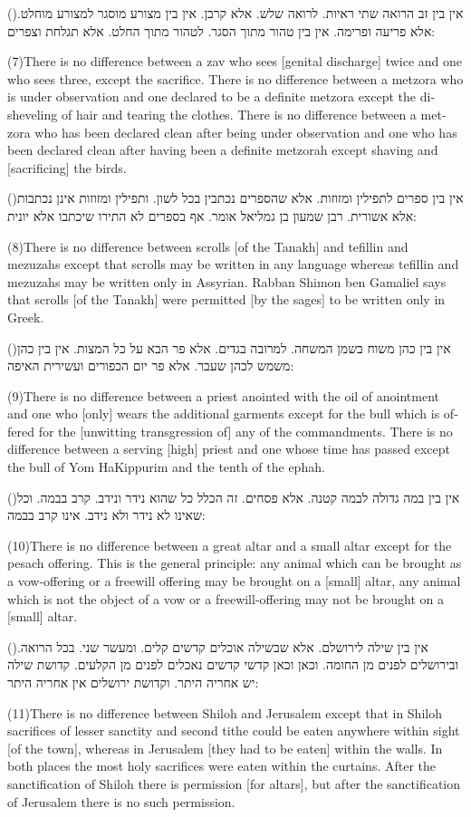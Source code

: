 \documentclass[12pt, openany]{book}
\newcommand{\sethebfont}{
\fontsize{10.5pt}{13.1pt} \selectfont
}
\newcommand{\hebeng}[2]{
	{\sethebfont #1\\}
	
	\begin{english}
		#2
	\end{english}
}
\newcommand{\vsnum}[1]{(\hebrewnumeral{#1})\space}
\newcommand{\vsnumeng}[1]{(#1)\space}
\begin{document}
\hebeng{\vsnum{7}אין בין זב הרואה שתי ראיות. לרואה שלש. אלא קרבן. אין בין מצורע מוסגר למצורע מוחלט. אלא פריעה ופרימה. אין בין טהור מתוך הסגר. לטהור מתוך החלט. אלא תגלחת וצפרים: 
}{\vsnumeng{7}There is no difference between a zav who sees {[genital discharge]} twice and one who sees three, except the sacrifice. There is no difference between a metzora who is under observation and one declared to be a definite metzora except the disheveling of hair and tearing the clothes. There is no difference between a metzora who has been declared clean after being under observation and one who has been declared clean after having been a definite metzorah except shaving and {[sacrificing]} the birds.}%

\hebeng{\vsnum{8}אין בין ספרים לתפילין ומזוזות. אלא שהספרים נכתבין בכל לשון. ותפילין ומזוזות אינן נכתבות אלא אשורית. רבן שמעון בן גמליאל אומר. אף בספרים לא התירו שיכתבו אלא יונית: 
}{\vsnumeng{8}There is no difference between scrolls {[of the Tanakh]} and tefillin and mezuzahs except that scrolls may be written in any language whereas tefillin and mezuzahs may be written only in Assyrian. Rabban Shimon ben Gamaliel says that scrolls {[of the Tanakh]} were permitted {[by the sages]} to be written only in Greek.}%

\hebeng{\vsnum{9}אין בין כהן משוח בשמן המשחה. למרובה בגדים. אלא פר הבא על כל המצות. אין בין כהן משמש לכהן שעבר. אלא פר יום הכפורים ועשירית האיפה: 
}{\vsnumeng{9}There is no difference between a priest anointed with the oil of anointment and one who {[only]} wears the additional garments except for the bull which is offered for the {[unwitting transgression of]} any of the commandments. There is no difference between a serving {[high]} priest and one whose time has passed except the bull of Yom HaKippurim and the tenth of the ephah.}%

\hebeng{\vsnum{10}אין בין במה גדולה לבמה קטנה. אלא פסחים. זה הכלל כל שהוא נידר ונידב. קרב בבמה. וכל שאינו לא נידר ולא נידב. אינו קרב בבמה: 
}{\vsnumeng{10}There is no difference between a great altar and a small altar except for the pesach offering. This is the general principle: any animal which can be brought as a vow-offering or a freewill offering may be brought on a {[small]} altar, any animal which is not the object of a vow or a freewill-offering may not be brought on a {[small]} altar.}%

\hebeng{\vsnum{11}אין בין שילה לירושלם. אלא שבשילה אוכלים קדשים קלים. ומעשר שני. בכל הרואה. ובירושלים לפנים מן החומה. וכאן וכאן קדשי קדשים נאכלים לפנים מן הקלעים. קדושת שילה יש אחריה היתר. וקדושת ירושלים אין אחריה היתר: 
}{\vsnumeng{11}There is no difference between Shiloh and Jerusalem except that in Shiloh sacrifices of lesser sanctity and second tithe could be eaten anywhere within sight {[of the town]}, whereas in Jerusalem {[they had to be eaten]} within the walls. In both places the most holy sacrifices were eaten within the curtains. After the sanctification of Shiloh there is permission {[for altars]}, but after the sanctification of Jerusalem there is no such permission.}%
\end{document}
